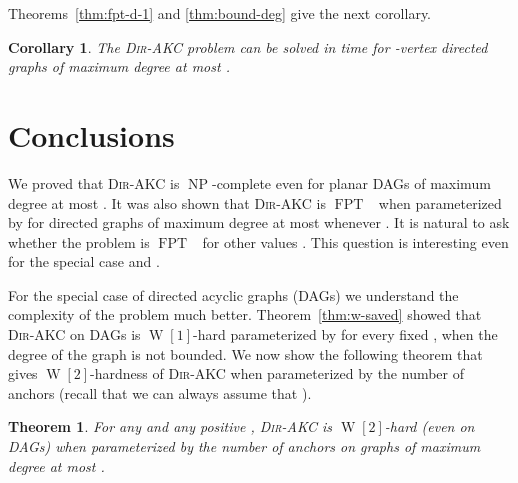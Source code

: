 \documentclass[11pt,a4paper]{article}
\newtheorem{theorem}{Theorem}
\newtheorem{corollary}{Corollary}
\DeclareMathOperator{\operatorClassNP}{NP}
\newcommand{\classNP}{\ensuremath{\operatorClassNP}}
\DeclareMathOperator{\operatorClassFPT}{FPT}
\newcommand{\classFPT}{\ensuremath{\operatorClassFPT}}
\DeclareMathOperator{\operatorClassW}{W}
\newcommand{\classW}[1]{\ensuremath{\operatorClassW[#1]}}
\newcommand{\DAKC}{\textsc{Dir-AKC}\xspace}
\begin{document}
Theorems~\ref{thm:fpt-d-1} and \ref{thm:bound-deg} give the next corollary.

\begin{corollary}\label{cor:fpt-delta}
The \DAKC problem can be solved in time   for -vertex directed graphs of maximum degree at most
.
\end{corollary}


\section{Conclusions}\label{sec:concl}
We proved that \DAKC is \classNP-complete even for planar DAGs of maximum degree at most . It was also shown  that \DAKC
is \classFPT~ when parameterized by  for directed graphs of maximum degree at most
 whenever . It is natural to ask whether the problem is \classFPT~ for other values . This question
is interesting even for the special case  and .

For the special case of  directed acyclic graphs (DAGs) we understand  the complexity of the problem much better.
Theorem~\ref{thm:w-saved} showed that \DAKC on DAGs is \classW{1}-hard parameterized by  for every fixed , when
the degree of the graph is not bounded. We now show the following theorem  that gives
\classW{2}-hardness of \DAKC when parameterized  by the number of anchors  (recall that we can always assume that ).

\begin{theorem}\label{thm:w-hardness-dags-bounded-degree}
For any  and any positive ,  \DAKC  is \classW{2}-hard (even on DAGs) when parameterized by
the number of anchors  on graphs of maximum degree at most .
\end{theorem}
\end{document}
